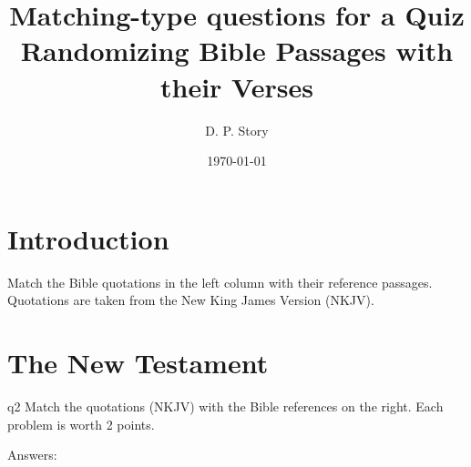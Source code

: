 \documentclass[11pt]{article}
\title{Matching-type questions for a Quiz\texorpdfstring{\\[1ex]}{: }Randomizing Bible Passages with their Verses}
\author{D. P. Story}
\date{\today}
\begin{document}
\maketitle

\section*{Introduction}

Match the Bible quotations in the left column with their reference passages.
Quotations are taken from the \textsf{New King James Version (NKJV)}.

\section*{The New Testament}

{%
  {}
  {}
  {}
}
{%
  {}
  {}
  {}
  {}
  {}
  {}
}
\showCreditMarkup


\begin{quiz}{q2}
Match the quotations (\textsf{NKJV}) with the Bible references on the right.
Each problem is worth 2 points.

\noindent
\begin{minipage}[t]{.75\linewidth}
\useNumbersOn
\begin{questions}
\begin{BblPsg}
\end{BblPsg}
\end{questions}
\end{minipage}\hfill
\begin{minipage}[t]{.25\linewidth-10pt}
\hideCreditMarkup
\begin{questions}[itemsep={0pt}]
\begin{BblVrs}
\end{BblVrs}
\end{questions}
\end{minipage}
\medskip\par
\end{quiz}\quad\PointsField\currQuiz\olBdry\CorrButton\currQuiz\cgBdry[6pt]
Answers: 
\end{document}
